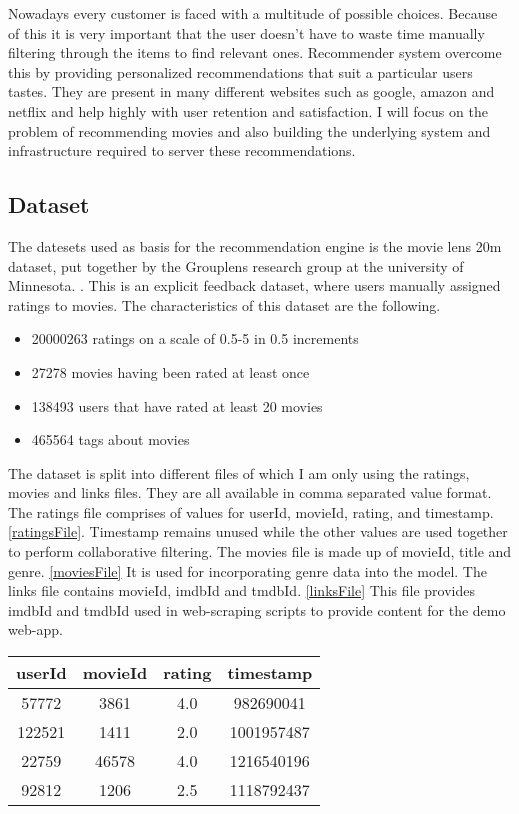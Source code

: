 Nowadays every customer is faced with a multitude of possible choices. Because of this it is very important that the user doesn't have to waste time manually filtering through the items to find relevant ones. Recommender system overcome this by providing personalized recommendations that suit a particular users tastes. They are present in many different websites such as google, amazon and netflix and help highly with user retention and satisfaction. I will focus on the problem of recommending movies and also building the underlying system and infrastructure required to server these recommendations.

\subsection{Dataset}
The datesets used as basis for the recommendation engine is the movie lens 20m dataset, put together by the Grouplens research group at the university of Minnesota. \citet{movielens}.
This is an explicit feedback dataset, where users manually assigned ratings to movies. The characteristics of this dataset are the following.
\begin{itemize}
    \item 20000263 ratings on a scale of 0.5-5 in 0.5 increments
    \item 27278 movies having been rated at least once
    \item 138493 users that have rated at least 20 movies
    \item 465564 tags about movies
\end{itemize}
The dataset is split into different files of which I am only using the ratings, movies and links files. 
They are all available in comma separated value format.
The ratings file comprises of values for userId, movieId, rating, and timestamp.\ref{ratingsFile}. Timestamp remains unused while the other values are used together to perform collaborative filtering.
The movies file is made up of movieId, title and genre. \ref{moviesFile} It is used for incorporating genre data into the model.
The links file contains movieId, imdbId and tmdbId. \ref{linksFile} This file provides imdbId and tmdbId used in web-scraping scripts to provide content for the demo web-app.

\begin{center}
    \begin{tabular}{||c c c c||} 
    \hline
    userId & movieId & rating & timestamp \\ [0.5ex] 
    \hline\hline
    57772 & 3861 & 4.0 & 982690041 \\ 
    \hline
    122521 & 1411 & 2.0 & 1001957487 \\
    \hline
    22759 & 46578 & 4.0 & 1216540196 \\
    \hline
    92812 & 1206 & 2.5 & 1118792437 \\ [1ex] 
    \hline
   \end{tabular}
\label{ratingsFile}
\end{center}

